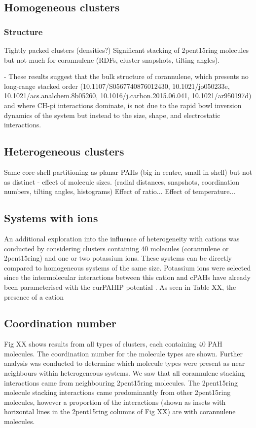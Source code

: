 \subsection{Homogeneous clusters}
\subsubsection{Structure}
Tightly packed clusters (densities?)
Significant stacking of 2pent15ring molecules but not much for corannulene (RDFs, cluster snapshots, tilting angles).


- These results suggest that the bulk structure of corannulene, which presents no long-range stacked order (10.1107/S0567740876012430, 10.1021/jo050233e, 10.1021/acs.analchem.8b05260, 10.1016/j.carbon.2015.06.041, 10.1021/ar950197d) and where CH-pi interactions dominate, is not due to the rapid bowl inversion dynamics of the system but instead to the size, shape, and electrostatic interactions.




\subsection{Heterogeneous clusters}
Same core-shell partitioning as planar PAHs (big in centre, small in shell) but not as distinct - effect of molecule sizes. (radial distances, snapshots, coordination numbers, tilting angles, histograms)
Effect of ratio...
Effect of temperature...


\subsection{Systems with ions}
An additional exploration into the influence of heterogeneity with cations was conducted by considering clusters containing 40 molecules (corannulene or 2pent15ring) and one or two potassium ions.  These systems can be directly compared to homogeneous systems of the same size.  Potassium ions were selected since the intermolecular interactions between this cation and cPAHs have already been parameterised with the curPAHIP potential \cite{bowal2019ion}. As seen in Table XX, the presence of a cation


\subsection{Coordination number}
Fig XX shows results from all types of clusters, each containing 40 PAH molecules.  The coordination number for the molecule types are shown.  Further analysis was conducted to determine which molecule types were present as near neighbours within heterogeneous systems.  We saw that all corannulene stacking interactions came from neighbouring 2pent15ring molecules.  The 2pent15ring molecule stacking interactions came predominantly from other 2pent15ring molecules, however a proportion of the interactions (shown as insets with horizontal lines in the 2pent15ring columns of Fig XX) are with corannulene molecules.

